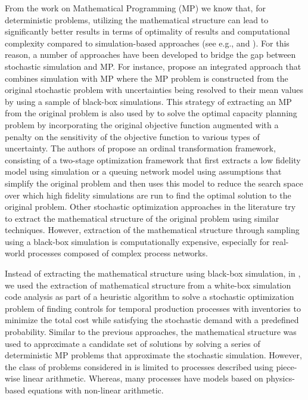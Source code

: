 \documentclass[a4paper, 12pt]{article} %
\begin{document}
From the work on Mathematical Programming (MP) we know that, for deterministic problems, utilizing the mathematical structure can lead to significantly better results in terms of optimality of results and computational complexity compared to simulation-based approaches (see e.g., \cite{Amaran2016} and \cite{Klemmt2009}). 
For this reason, a number of approaches have been developed to bridge the gap between stochastic simulation and MP.
For instance, \cite{thompson_integrated_1990} propose an integrated approach that combines simulation with MP where the MP problem is constructed from the original stochastic problem with uncertainties being resolved to their mean values by using a sample of black-box simulations. This strategy of extracting an MP from the original problem is also used by \cite{paraskevopoulos_robust_1991} to solve the optimal capacity planning problem by incorporating the original objective function augmented with a penalty on the sensitivity of the objective function to various types of uncertainty.
The authors of \cite{Xu2014MultiFid} propose an ordinal transformation framework, 
consisting of a two-stage optimization framework that first extracts a low fidelity model using simulation or a queuing network model using assumptions that simplify the original problem and then uses this model to reduce the search space over which high fidelity simulations are run to find the optimal solution to the original problem.
Other stochastic optimization approaches in the literature try to extract the mathematical structure of the original problem using similar techniques.
However, extraction of the mathematical structure through sampling using a black-box simulation is computationally expensive, especially for real-world processes composed of complex process networks.

Instead of extracting the mathematical structure using black-box simulation, in \cite{Krishnamoorthy2015}, we used the extraction of mathematical structure from a white-box simulation code analysis as part of a heuristic algorithm to solve a stochastic optimization problem of finding controls for temporal production processes with inventories to minimize the total cost while satisfying the stochastic demand with a predefined probability.
Similar to the  previous approaches, the mathematical structure was used to approximate a candidate set of solutions by solving a series of deterministic MP problems that approximate the stochastic simulation. 
However, the class of problems considered in \cite{Krishnamoorthy2015} is limited to processes described using piece-wise linear arithmetic. 
Whereas, many processes have models based on physics-based equations with non-linear arithmetic. 
\end{document}
